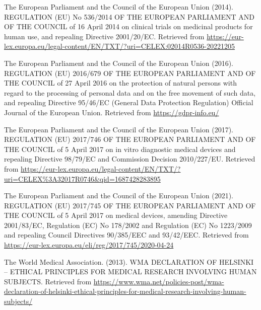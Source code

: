 \documentclass[authordate, empirical]{jote-new-article}
\begin{document}
	The European Parliament and the Council of the European Union (2014). {REGULATION (EU) No 536/2014 OF THE EUROPEAN PARLIAMENT AND OF THE COUNCIL of 16 April 2014 on clinical trials on medicinal products for human use, and repealing Directive 2001/20/EC}. Retrieved from \href{https://eur-lex.europa.eu/legal-content/EN/TXT/?uri=CELEX:02014R0536-20221205}{https://eur-lex.europa.eu/legal-content/EN/TXT/?uri=CELEX:02014R0536-20221205}



	The European Parliament and the Council of the European Union (2016). {REGULATION (EU) 2016/679 OF THE EUROPEAN PARLIAMENT AND OF THE COUNCIL of 27 April 2016 on the protection of natural persons with regard to the processing of personal data and on the free movement of such data, and repealing Directive 95/46/EC (General Data Protection Regulation) }Official Journal of the European Union. Retrieved from \href{https://gdpr-info.eu/}{https://gdpr-info.eu/}



	The European Parliament and the Council of the European Union (2017). {REGULATION (EU) 2017/746 OF THE EUROPEAN PARLIAMENT AND OF THE COUNCIL of 5 April 2017 on in vitro diagnostic medical devices and repealing Directive 98/79/EC and Commission Decision 2010/227/EU}. Retrieved from \href{https://eur-lex.europa.eu/legal-content/EN/TXT/?uri=CELEX%3A32017R0746&amp;qid=1687428283895}{https://eur-lex.europa.eu/legal-content/EN/TXT/?uri=CELEX\%3A32017R0746\&qid=1687428283895}



	The European Parliament and the Council of the European Union (2021). {REGULATION (EU) 2017/745 OF THE EUROPEAN PARLIAMENT AND OF THE COUNCIL of 5 April 2017 on medical devices, amending Directive 2001/83/EC, Regulation (EC) No 178/2002 and Regulation (EC) No 1223/2009 and repealing Council Directives 90/385/EEC and 93/42/EEC}. Retrieved from \href{https://eur-lex.europa.eu/eli/reg/2017/745/2020-04-24}{https://eur-lex.europa.eu/eli/reg/2017/745/2020-04-24}



	The World Medical Association. (2013). {WMA DECLARATION OF HELSINKI -- ETHICAL PRINCIPLES FOR MEDICAL RESEARCH INVOLVING HUMAN SUBJECTS}. Retrieved from \href{https://www.wma.net/policies-post/wma-declaration-of-helsinki-ethical-principles-for-medical-research-involving-human-subjects/}{https://www.wma.net/policies-post/wma-declaration-of-helsinki-ethical-principles-for-medical-research-involving-human-subjects/}
\end{document}
